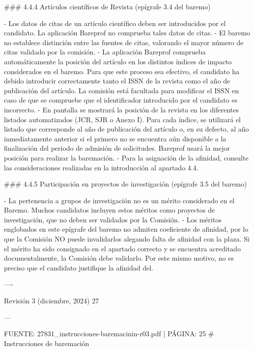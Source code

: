 \documentclass{article}
\begin{document}
\begin{itemize}
\begin{itemize}
\begin{scriptsize}
                  \#\#\# 4.4.4 Artículos científicos de Revista (epígrafe 3.4 del baremo)

                  - Los datos de citas de un artículo científico deben ser introducidos por el candidato. La aplicación Bareprof no comprueba tales datos de citas.
                  - El baremo no establece distinción entre las fuentes de citas, valorando el mayor número de citas validado por la comisión.
                  - La aplicación Bareprof comprueba automáticamente la posición del artículo en los distintos índices de impacto considerados en el baremo. Para que este proceso sea efectivo, el candidato ha debido introducir correctamente tanto el ISSN de la revista como el año de publicación del artículo. La comisión está facultada para modificar el ISSN en caso de que se compruebe que el identificador introducido por el candidato es incorrecto.
                  - En pantalla se mostrará la posición de la revista en los diferentes listados automatizados (JCR, SJR o Anexo I). Para cada índice, se utilizará el listado que corresponde al año de publicación del artículo o, en su defecto, al año inmediatamente anterior si el primero no se encuentra aún disponible a la finalización del periodo de admisión de solicitudes. Bareprof usará la mejor posición para realizar la baremación.
                  - Para la asignación de la afinidad, consulte las consideraciones realizadas en la introducción al apartado 4.4.

                  \#\#\# 4.4.5 Participación en proyectos de investigación (epígrafe 3.5 del baremo)

                  - La pertenencia a grupos de investigación no es un mérito considerado en el Baremo. Muchos candidatos incluyen estos méritos como proyectos de investigación, que no deben ser validados por la Comisión.
                  - Los méritos englobados en este epígrafe del baremo no admiten coeficiente de afinidad, por lo que la Comisión NO puede invalidarlos alegando falta de afinidad con la plaza. Si el mérito ha sido consignado en el apartado correcto y se encuentra acreditado documentalmente, la Comisión debe validarlo. Por este mismo motivo, no es preciso que el candidato justifique la afinidad del.

                  ----

                  Revisión 3 (diciembre, 2024) 27

                  ---

                  FUENTE: 27831\_instrucciones-baremacinin-r03.pdf | PÁGINA: 25
                  \# Instrucciones de baremación


\end{scriptsize}
\end{itemize}
\end{itemize}
\end{document}
